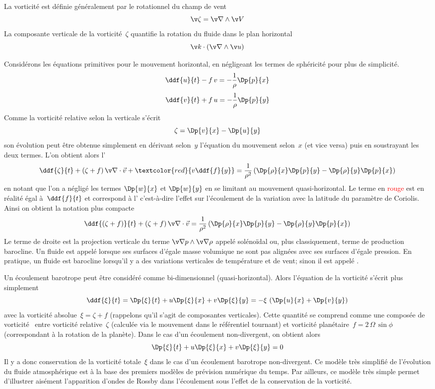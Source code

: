 \sk
La vorticité est définie généralement par le rotationnel du champ de vent
\[ \v \zeta = \v \nabla \wedge \v V \]
\noindent La composante verticale de la vorticité~$\zeta$
quantifie la rotation du fluide dans le plan horizontal
\[ \v k \cdot \left( \v \nabla \wedge \v u \right) \]

\sk
Considérons les équations primitives pour le mouvement horizontal,
en négligeant les termes de sphéricité pour plus de simplicité.
\[ \ddf{u}{t} - f\,v = -\frac{1}{\rho} \Dp{p}{x} \]
\[ \ddf{v}{t} + f\,u = -\frac{1}{\rho} \Dp{p}{y} \]
\noindent Comme la vorticité relative selon la verticale s'écrit
\[ \zeta = \Dp{v}{x} - \Dp{u}{y} \]
\noindent son évolution peut être obtenue simplement en
dérivant selon~$y$ l'équation du mouvement selon~$x$
(et vice versa) puis en soustrayant les deux termes.
L'on obtient alors l'
\[
\ddf{\zeta}{t} + (\zeta+f) \, \v \nabla \cdot \vec v + \textcolor{red}{v \ddf{f}{y}}
= \frac{1}{\rho^2} \left( \Dp{\rho}{x} \Dp{p}{y} - \Dp{\rho}{y} \Dp{p}{x} \right)
\]
\noindent en notant que l'on a négligé les termes
$\Dp{w}{x}$ et $\Dp{w}{y}$ en se limitant au mouvement quasi-horizontal.
Le terme en \textcolor{red}{rouge} est en réalité égal à~$\ddf{f}{t}$
et correspond à l' c'est-à-dire
l'effet sur l'écoulement de la variation avec la
latitude du paramètre de Coriolis.
Ainsi on obtient la notation plus compacte
\[
\ddf{(\zeta + f)}{t} + (\zeta+f) \, \v \nabla \cdot \vec v
= \frac{1}{\rho^2} \left( \Dp{\rho}{x} \Dp{p}{y} - \Dp{\rho}{y} \Dp{p}{x} \right)
\]
\noindent Le terme de droite est la projection verticale
du terme $\v \nabla p \wedge \v \nabla \rho$
appelé solénoïdal ou, plus classiquement, terme de production barocline.
Un fluide est appelé  lorsque
ses surfaces d'égale masse volumique
ne sont pas alignées avec ses surfaces d'égale pression.
En pratique, un fluide est barocline
lorsqu'il y a des variations verticales de température
et de vent; sinon il est appelé .


\sk
Un écoulement barotrope peut être considéré comme bi-dimensionnel (quasi-horizontal).
Alors l'équation de la vorticité s'écrit plus simplement
\[
\ddf{\xi}{t}
=
\Dp{\xi}{t} + u \Dp{\xi}{x} + v \Dp{\xi}{y}
=
- \xi \, \left( \Dp{u}{x} + \Dp{v}{y} \right)
\]
\noindent avec la vorticité absolue~$\xi = \zeta + f$
(rappelons qu'il s'agit de composantes verticales). 
Cette quantité se comprend comme une \og composée de vorticité \fg~entre
vorticité relative~$\zeta$ (calculée via le mouvement dans le référentiel tournant)
et vorticité planétaire~$f = 2\,\Omega\,\sin\phi$ (correspondant à la rotation de la planète).
Dans le cas d'un écoulement non-divergent, on obtient alors
\[
\Dp{\xi}{t} + u \Dp{\xi}{x} + v \Dp{\xi}{y}
=
0
\]
\noindent Il y a donc conservation de la vorticité totale~$\xi$
dans le cas d'un écoulement barotrope non-divergent.
Ce modèle très simplifié de l'évolution du fluide atmosphérique
est à la base des premiers modèles de prévision numérique du temps.
Par ailleurs, ce modèle très simple permet d'illustrer aisément
l'apparition d'ondes de Rossby dans l'écoulement 
sous l'effet de la conservation de la vorticité.

